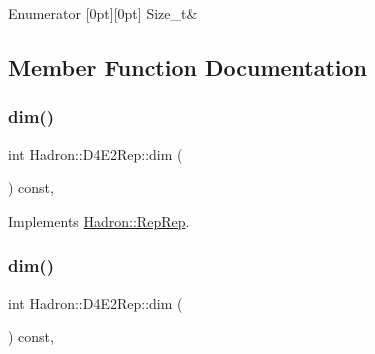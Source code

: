 \begin{DoxyEnumFields}{Enumerator}
[0pt][0pt]{}\mbox{\label{structHadron_1_1D4E2Rep_ac358d86e845a03d8441e9427175b4ef4abd9704db250d05eab94bc3444f7411c3}} 
Size\+\_\+t&\\
\hline

\end{DoxyEnumFields}


\subsection{Member Function Documentation}
\mbox{\label{structHadron_1_1D4E2Rep_a4c70a287724e1537c34e7795797f2f09}} 
\subsubsection{\texorpdfstring{dim()}{dim()}\hspace{0.1cm}{\footnotesize\ttfamily [1/3]}}
{\footnotesize\ttfamily int Hadron\+::\+D4\+E2\+Rep\+::dim (\begin{DoxyParamCaption}{ }\end{DoxyParamCaption}) const\hspace{0.3cm}{\ttfamily [inline]}, {\ttfamily [virtual]}}



Implements \mbox{\hyperlink{structHadron_1_1RepRep_a92c8802e5ed7afd7da43ccfd5b7cd92b}{Hadron\+::\+Rep\+Rep}}.

\mbox{\label{structHadron_1_1D4E2Rep_a4c70a287724e1537c34e7795797f2f09}} 
\subsubsection{\texorpdfstring{dim()}{dim()}\hspace{0.1cm}{\footnotesize\ttfamily [2/3]}}
{\footnotesize\ttfamily int Hadron\+::\+D4\+E2\+Rep\+::dim (\begin{DoxyParamCaption}{ }\end{DoxyParamCaption}) const\hspace{0.3cm}{\ttfamily [inline]}, {\ttfamily [virtual]}}



